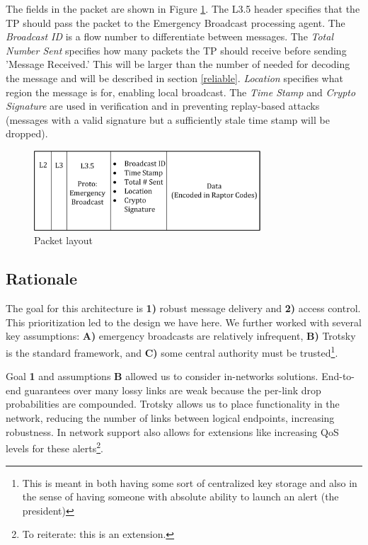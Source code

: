 The fields in the packet are shown in Figure \ref{fig:pckt}. The L3.5 header specifies that the TP should pass the packet to the Emergency Broadcast processing agent. The\textit{ Broadcast ID} is a  flow number to differentiate between messages. The \textit{Total Number Sent} specifies how many packets the TP should receive before sending 'Message Received.' This will be larger than the number of needed for decoding the message and will be described in section \ref{reliable}. \textit{Location} specifies what region the message is for, enabling local broadcast. The \textit{Time Stamp} and \textit{Crypto Signature} are used in verification and in preventing replay-based attacks (messages with a valid signature but a sufficiently stale time stamp will be dropped).
\begin{figure}[tp]
\centering
\includegraphics[width=8.5cm]{figures/packet_header.png}
\caption{Packet layout}
\label{fig:pckt}
\end{figure}

\subsection{Rationale}
The goal for this architecture is \textbf{1)} robust message delivery and \textbf{2)} access control. This prioritization led to the design we have here. We further worked with several key assumptions:  \textbf{A)} emergency broadcasts are relatively infrequent, \textbf{B)} Trotsky is the standard framework, and \textbf{C)} some central authority must be trusted\footnote{This is meant in both having some sort of centralized key storage and also in the sense of having someone with absolute ability to launch an alert (the president)}. 

Goal \textbf{1} and assumptions \textbf{B} allowed us to consider in-networks solutions. End-to-end guarantees over many lossy links are weak because the per-link drop probabilities are compounded. Trotsky allows us to place functionality in the network, reducing the number of links between logical endpoints, increasing robustness. In network support also allows for extensions like increasing QoS levels for these alerts\footnote{To reiterate: this is an extension.}. 


